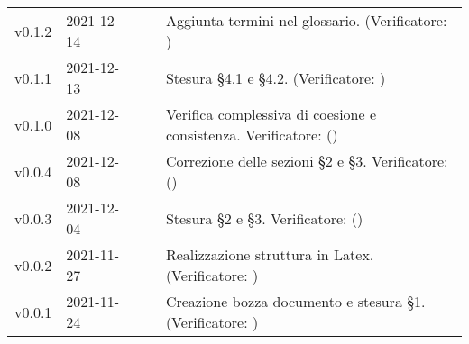 \begin{longtable}{ m{}<{\centering}  m{}<{\centering}  m{}<{\centering}  m{}<{\centering}  m{}<{\centering} }
	v0.1.2& 2021-12-14 & \EP{} & \AM{} & Aggiunta termini nel glossario. (Verificatore: \textit{\MG})\\

	v0.1.1& 2021-12-13 & \MB{} & \AM{} & Stesura §4.1 e §4.2. (Verificatore: \textit{\MG})\\

	v0.1.0& 2021-12-08 & \MB{} & \AM{} & Verifica complessiva di coesione e consistenza. Verificatore: (\textit{\FP}) \\	

	v0.0.4& 2021-12-08 & \MB{} & \AM{} & Correzione delle sezioni §2 e §3. Verificatore: (\textit{\FP}) \\

	v0.0.3& 2021-12-04 & \MB{} & \AM{} & Stesura §2 e §3. Verificatore: (\textit{\FP}) \\

	v0.0.2& 2021-11-27 & \EP{} & \AM{} & Realizzazione struttura in Latex. (Verificatore: \textit{\FP})\\

	v0.0.1& 2021-11-24 & \MB{} & \RE{} & Creazione bozza documento e stesura §1. (Verificatore: \textit{\FP}) \\

\end{longtable}

\pagebreak
